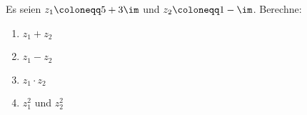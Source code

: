 \begin{exercise}
  Es seien $z_1 \coloneqq 5 + 3\im$ und $z_2 \coloneqq 1 - \im$. Berechne:
  \begin{enumerate}[label=(\alph*)]  \item $z_1 + z_2$
  \item $z_1 - z_2$
  \item $z_1 \cdot z_2$
  \item $ z_1^2 $ und $z_2^2$
  \end{enumerate}
\end{exercise}
